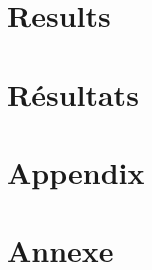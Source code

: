 \ml
{\chapter{Results}}
{\chapter{Résultats}}



\appendix

\ml
{\chapter{Appendix}}
{\chapter{Annexe}}
\pagebreak





\singlespacing





